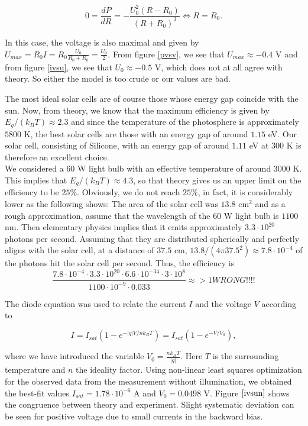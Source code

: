 \documentclass[a4paper]{article}
\begin{document}
\begin{displaymath}
  0=\frac{dP}{dR}=-\frac{U_0^2(R-R_0)}{(R+R_0)^3}\iff R=R_0.
\end{displaymath}

In this case, the voltage is also maximal and given by $U_{max}=R_0I=R_0\frac{U_0}{R_0+R_0}=\frac{U_0}{2}$.
From figure \ref{pvsv}, we see that $U_{max}\approx -0.4$ V and from figure \ref{ivsu}, we see that $U_0\approx -0.5$ V, which does not at all agree with theory. So either the model is too crude or our values are bad.

The most ideal solar cells are of course those whose energy gap coincide with the sun. Now, from theory, we know that the maximum efficiency is given by $E_g/(k_BT)\approx 2.3$ and since the temperature of the photosphere is approximately $5800$ K, the best solar cells are those with an energy gap of around $1.15$ eV.
Our solar cell, consisting of Silicone, with an energy gap of around $1.11$ eV at $300$ K is therefore an excellent choice. \\

We considered a $60$ W light bulb with an effective temperature of around $3000$ K. This implies that $E_g/(k_B T)\approx 4.3$, so that theory gives us an upper limit on the efficiency to be $25$\%.
Obviously, we do not reach $25$\%, in fact, it is considerably lower as the following shows:
The area of the solar cell was $13.8$ cm${}^2$ and as a rough approximation, assume that the wavelength of the $60$ W light bulb is $1100$ nm. Then elementary physics implies that it emits approximately $3.3\cdot 10^{20}$ photons per second. Assuming that they are distributed spherically and perfectly aligns with the solar cell, at a distance of $37.5$ cm, $13.8/(4\pi 37.5^2)\approx 7.8\cdot 10^{-4}$ of the photons hit the solar cell per second.
Thus, the efficiency is 
\begin{displaymath}
  \frac{7.8\cdot 10^{-4}\cdot 3.3\cdot 10^{20}\cdot 6.6\cdot 10^{-34}\cdot 3\cdot 10^8}{1100\cdot 10^{-9}\cdot 0.033 }\approx >1 WRONG!!!!
\end{displaymath}

The diode equation was used to relate the current $I$ and the voltage $V$ according to

$$I = I_{sat}\left(1-e^{-|q|V/nk_BT}\right) = I_{sat}\left(1-e^{-V/V_0}\right),$$

where we have introduced the variable $V_0 = \frac{nk_BT}{|q|}$. Here $T$ is the surrounding temperature and $n$ the ideality factor. Using non-linear least squares optimization for the observed data from the measurement without illumination, we obtained the best-fit values $I_{sat}=1.78\cdot 10^{-6}$ A and $V_0=0.0498$ V. Figure $\ref{ivsun}$ shows the congruence between theory and experiment. Slight systematic deviation can be seen for positive voltage due to small currents in the backward bias. \\
\end{document}
